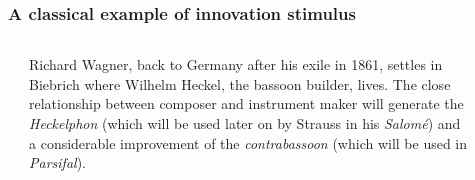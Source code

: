 \begin{frame}
		\frametitle{A classical example of innovation stimulus}

    \begin{columns}[T]
        \begin{column}{0.2\textwidth}
        \end{column}
        \begin{column}{0.5\textwidth}
					\begin{small}
						\alert{Richard Wagner, back to Germany after his exile in 1861,
						settles in Biebrich where Wilhelm Heckel, the bassoon builder, lives.
						The close relationship between composer and instrument maker
						will generate the \emph{Heckelphon} (which will be used later on
						by Strauss in his \emph{Salom\'e}) and a considerable improvement
						of the \emph{contrabassoon} (which will be used in
						\emph{Parsifal}).}
					\end{small}
        \end{column}
        \begin{column}{0.05\textwidth}
        \end{column}
        \begin{column}{0.1\textwidth}
        \end{column}
    \end{columns}
\end{frame}

